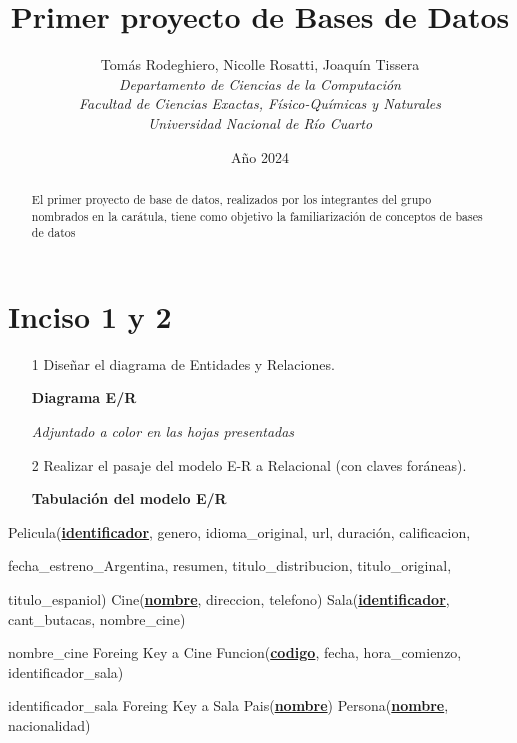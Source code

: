 \documentclass[15pt]{article}
\title{
  Primer proyecto de Bases de Datos
}
\author{
  Tomás Rodeghiero, Nicolle Rosatti, Joaquín Tissera \\
  \textit{Departamento de Ciencias de la Computación} \\
  \textit{Facultad de Ciencias Exactas, Físico-Químicas y Naturales} \\\textit{Universidad Nacional de Río Cuarto}
}
\date{Año 2024}
\begin{document}
\maketitle

\newpage

\begin{abstract}
El primer proyecto de base de datos, realizados por los integrantes del grupo nombrados en la carátula, tiene como objetivo la familiarización de conceptos de bases de datos
\end{abstract}

\newpage

\section{Inciso 1 y 2}
    \begin{itemize}
        \item[1] Diseñar el diagrama de Entidades y Relaciones.
            \begin{center}
              \textbf{Diagrama E/R}
              
              \textit{Adjuntado a color en las hojas presentadas}
              \newline
            \end{center}
        \item[2] Realizar el pasaje del modelo E-R a Relacional (con claves foráneas).
            \begin{center}
                \textbf{Tabulación del modelo E/R}
            \end{center}
    \end{itemize}
\newline
Pelicula(\underline{\textbf{identificador}}, genero, idioma\_original, url, duración, calificacion, 

fecha\_estreno\_Argentina, resumen, titulo\_distribucion, titulo\_original, 

titulo\_espaniol)
\newline
Cine(\underline{\textbf{nombre}}, direccion, telefono)
\newline
Sala(\underline{\textbf{identificador}}, cant\_butacas, nombre\_cine)

\hspace{1cm} nombre\_cine Foreing Key a Cine
\newline
Funcion(\underline{\textbf{codigo}}, fecha, hora\_comienzo, identificador\_sala)

\hspace{1cm} identificador\_sala Foreing Key a Sala
\newline
Pais(\underline{\textbf{nombre}})
\newline
Persona(\underline{\textbf{nombre}}, nacionalidad)
\end{document}

